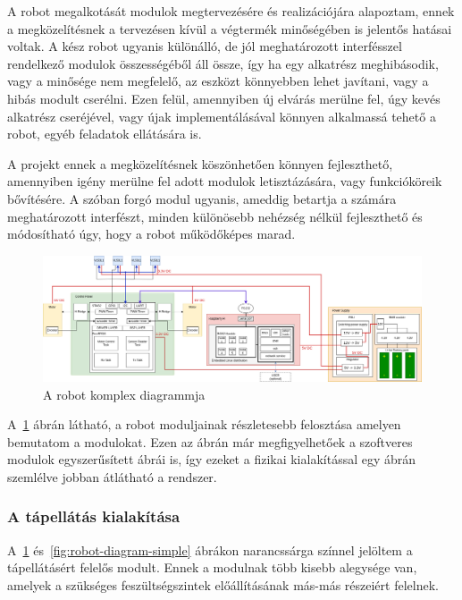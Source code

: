A robot megalkotását modulok megtervezésére és realizációjára alapoztam, ennek a
megközelítésnek a tervezésen kívül a végtermék minőségében is jelentős hatásai
voltak. A kész robot ugyanis különálló, de jól meghatározott interfésszel
rendelkező modulok összességéből áll össze, így ha egy alkatrész meghibásodik,
vagy a minősége nem megfelelő, az eszközt könnyebben lehet javítani, vagy a hibás
modult cserélni. Ezen felül, amennyiben új elvárás merülne fel, úgy kevés
alkatrész cseréjével, vagy újak implementálásával könnyen alkalmassá tehető a
robot, egyéb feladatok ellátására is.

A projekt ennek a megközelítésnek köszönhetően könnyen fejleszthető, amennyiben
igény merülne fel adott modulok letisztázására, vagy funkcióköreik bővítésére. A
szóban forgó modul ugyanis, ameddig betartja a számára meghatározott interfészt,
minden különösebb nehézség nélkül fejleszthető és módosítható úgy, hogy a robot
működőképes marad.

\begin{figure}
  \centering
  \includegraphics[width=150mm, keepaspectratio]{figures/ch2/robot-diagram-complex.png}
  \caption{A robot komplex diagrammja}
  \label{fig:robot-diagram-complex}
\end{figure}

\medskip

A~\ref{fig:robot-diagram-complex} ábrán látható, a robot moduljainak részletesebb
felosztása amelyen bemutatom a modulokat. Ezen az ábrán már megfigyelhetőek a
szoftveres modulok egyszerűsített ábrái is, így ezeket a fizikai kialakítással
egy ábrán szemlélve jobban átlátható a rendszer.

\subsubsection{A tápellátás kialakítása}
A~\ref{fig:robot-diagram-complex} és~\ref{fig:robot-diagram-simple} ábrákon
narancssárga színnel jelöltem a tápellátásért felelős modult. Ennek a modulnak
több kisebb alegysége van, amelyek a szükséges feszültségszintek előállításának
más-más részeiért felelnek.


